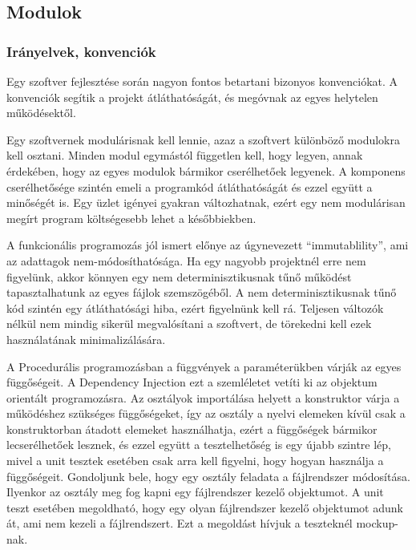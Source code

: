 \documentclass[a4paper,12pt,oneside]{report}
\begin{document}
\newpage
\subsection{Modulok}
\subsubsection{Irányelvek, konvenciók}

\begin{justify}

	Egy szoftver fejlesztése során nagyon fontos betartani bizonyos konvenciókat. A konvenciók segítik a projekt átláthatóságát, és megóvnak az egyes helytelen működésektől. \cite{website:coding_standards_matter} 

	Egy szoftvernek modulárisnak kell lennie, azaz a szoftvert különböző modulokra kell osztani. Minden modul egymástól független kell, hogy legyen, annak érdekében, hogy az egyes modulok bármikor cserélhetőek legyenek. A komponens cserélhetősége szintén emeli a programkód átláthatóságát és ezzel együtt a minőségét is. Egy üzlet igényei gyakran változhatnak, ezért egy nem modulárisan megírt program költségesebb lehet a későbbiekben. \cite{book:replace_component}

	A funkcionális programozás jól ismert előnye az úgynevezett “immutablility”, ami az adattagok nem-módosíthatósága. Ha egy nagyobb projektnél erre nem figyelünk, akkor könnyen egy nem determinisztikusnak tűnő működést tapasztalhatunk az egyes fájlok szemszögéből. A nem determinisztikusnak tűnő kód szintén egy átláthatósági hiba, ezért figyelnünk kell rá. Teljesen változók nélkül nem mindig sikerül megvalósítani a szoftvert, de törekedni kell ezek használatának minimalizálására. 

	A Procedurális programozásban a függvények a paraméterükben várják az egyes függőségeit. A Dependency Injection ezt a szemléletet vetíti ki az objektum orientált programozásra. Az osztályok importálása helyett a konstruktor várja a működéshez szükséges függőségeket, így az osztály a nyelvi elemeken kívül csak a konstruktorban átadott elemeket használhatja, ezért a függőségek bármikor lecserélhetőek lesznek, és ezzel együtt a tesztelhetőség is egy újabb szintre lép, mivel a unit tesztek esetében csak arra kell figyelni, hogy hogyan használja a függőségeit. Gondoljunk bele, hogy egy osztály feladata a fájlrendszer módosítása. \cite{website:dependency_injection, website:dependency_injection_procedural} Ilyenkor az osztály meg fog kapni egy fájlrendszer kezelő objektumot. A unit teszt esetében megoldható, hogy egy olyan fájlrendszer kezelő objektumot adunk át, ami nem kezeli a fájlrendszert. Ezt a megoldást hívjuk a teszteknél mockup-nak. 


\end{justify}
\end{document}
